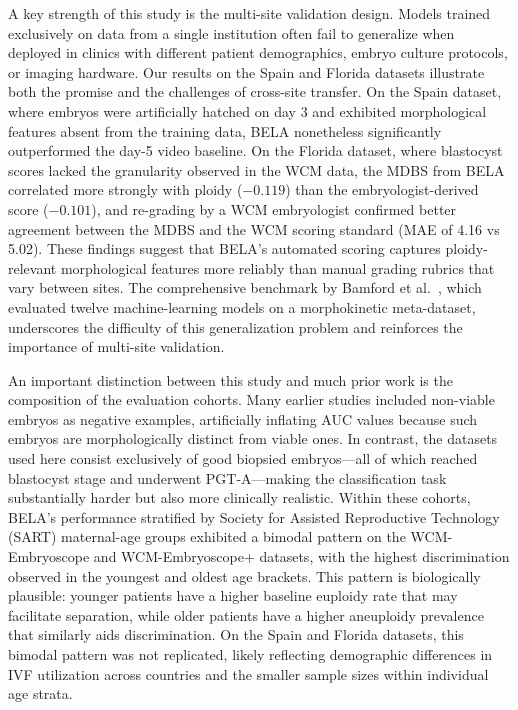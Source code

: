 \documentclass[11pt]{article}
\begin{document}
A key strength of this study is the multi-site validation design. Models trained exclusively on data from a single institution often fail to generalize when deployed in clinics with different patient demographics, embryo culture protocols, or imaging hardware. Our results on the Spain and Florida datasets illustrate both the promise and the challenges of cross-site transfer. On the Spain dataset, where embryos were artificially hatched on day 3 and exhibited morphological features absent from the training data, BELA nonetheless significantly outperformed the day-5 video baseline. On the Florida dataset, where blastocyst scores lacked the granularity observed in the WCM data, the MDBS from BELA correlated more strongly with ploidy ($-0.119$) than the embryologist-derived score ($-0.101$), and re-grading by a WCM embryologist confirmed better agreement between the MDBS and the WCM scoring standard (MAE of 4.16 vs 5.02). These findings suggest that BELA's automated scoring captures ploidy-relevant morphological features more reliably than manual grading rubrics that vary between sites. The comprehensive benchmark by Bamford et al.\ \citep{bamford2023ml12}, which evaluated twelve machine-learning models on a morphokinetic meta-dataset, underscores the difficulty of this generalization problem and reinforces the importance of multi-site validation.

An important distinction between this study and much prior work is the composition of the evaluation cohorts. Many earlier studies included non-viable embryos as negative examples, artificially inflating AUC values because such embryos are morphologically distinct from viable ones. In contrast, the datasets used here consist exclusively of good biopsied embryos---all of which reached blastocyst stage and underwent PGT-A---making the classification task substantially harder but also more clinically realistic. Within these cohorts, BELA's performance stratified by Society for Assisted Reproductive Technology (SART) maternal-age groups exhibited a bimodal pattern on the WCM-Embryoscope and WCM-Embryoscope+ datasets, with the highest discrimination observed in the youngest and oldest age brackets. This pattern is biologically plausible: younger patients have a higher baseline euploidy rate that may facilitate separation, while older patients have a higher aneuploidy prevalence that similarly aids discrimination. On the Spain and Florida datasets, this bimodal pattern was not replicated, likely reflecting demographic differences in IVF utilization across countries and the smaller sample sizes within individual age strata.
\end{document}
